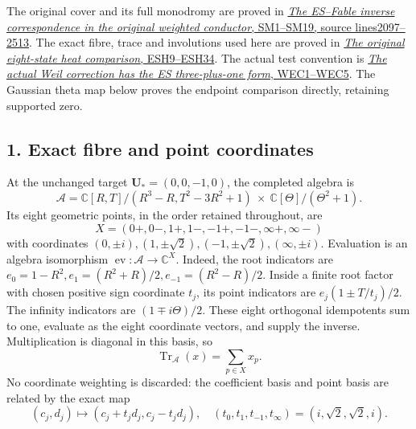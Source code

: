 \documentclass[
  10pt,
  a4paper,
]{article}
\begin{document}
The original cover and its full monodromy are proved in
\href{https://github.com/KokunoYumeto/zeta-function-research-reader/blob/ab45e221579a0d48ce2885b4ecdf1a6aefc24a20/workbenches/splitzero-tandem/continuations/20260920-fable-boundary-action/FABLE_TO_ORIGINAL_CONDUCTOR.tex\#L2097}{\emph{The
ES--Fable inverse correspondence in the original weighted conductor},
SM1--SM19, source lines2097--2513}. The exact fibre, trace and
involutions used here are proved in
\href{https://github.com/KokunoYumeto/zeta-function-research-reader/blob/d5c9d198a8432e3ede468b280162a99c00e3f4f7/workbenches/splitzero-tandem/branches/tau-zero-prime-positivity/EIGHT_STATE_HEAT_COMPARISON.md}{\emph{The
original eight-state heat comparison}, ESH9--ESH34}. The actual test
convention is
\href{https://github.com/KokunoYumeto/zeta-function-research-reader/blob/d5c9d198a8432e3ede468b280162a99c00e3f4f7/workbenches/splitzero-tandem/branches/tau-zero-prime-positivity/WEIL_ES_COMPENSATION_DERIVATION.md}{\emph{The
actual Weil correction has the ES three-plus-one form}, WEC1--WEC5}. The
Gaussian theta map below proves the endpoint comparison directly,
retaining supported zero.

\subsection{1. Exact fibre and point
coordinates}\label{exact-fibre-and-point-coordinates}

At the unchanged target \(\mathbf U_*=(0,0,-1,0)\), the completed
algebra is \[
\mathcal A=\mathbb C[R,T]/(R^3-R,T^2-3R^2+1)
\ \times\ \mathbb C[\Theta]/(\Theta^2+1).
\tag{HWA1}
\] Its eight geometric points, in the order retained throughout, are \[
X=(0+,0-,1+,1-,-1+,-1-,\infty+,\infty-)
\tag{HWA2}
\] with coordinates
\((0,\pm i),(1,\pm\sqrt2),(-1,\pm\sqrt2),(\infty,\pm i)\). Evaluation is
an algebra isomorphism \(\operatorname{ev}:\mathcal A\to\mathbb C^X\).
Indeed, the root indicators are
\(e_0=1-R^2,e_1=(R^2+R)/2,e_{-1}=(R^2-R)/2\). Inside a finite root
factor with chosen positive sign coordinate \(t_j\), its point
indicators are \(e_j(1\pm T/t_j)/2\). The infinity indicators are
\((1\mp i\Theta)/2\). These eight orthogonal idempotents sum to one,
evaluate as the eight coordinate vectors, and supply the inverse.
Multiplication is diagonal in this basis, so \[
\operatorname{Tr}_{\mathcal A}(x)=\sum_{p\in X}x_p.
\tag{HWA3}
\] No coordinate weighting is discarded: the coefficient basis and point
basis are related by the exact map \[
(c_j,d_j)\longmapsto(c_j+t_jd_j,c_j-t_jd_j),
\quad(t_0,t_1,t_{-1},t_\infty)=(i,\sqrt2,\sqrt2,i).
\tag{HWA4}
\]
\end{document}
